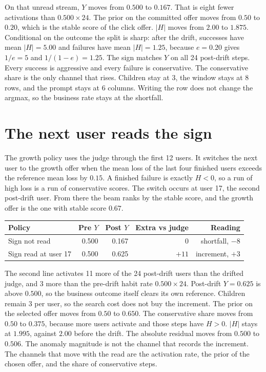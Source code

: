\documentclass[11pt,a4paper]{article}
\begin{document}
On that unread stream, \(Y\) moves from \(0.500\) to \(0.167\).
That is eight fewer activations than \(0.500\times 24\).
The prior on the committed offer moves from \(0.50\) to \(0.20\), which is the stable score of the click offer.
\(|H|\) moves from \(2.00\) to \(1.875\).
Conditional on the outcome the split is sharp: after the drift, successes have mean \(|H|=5.00\) and failures have mean \(|H|=1.25\), because \(e=0.20\) gives \(1/e=5\) and \(1/(1-e)=1.25\).
The sign matches \(Y\) on all 24 post-drift steps.
Every success is aggressive and every failure is conservative.
The conservative share is the only channel that rises.
Children stay at 3, the window stays at 8 rows, and the prompt stays at 6 columns.
Writing the row does not change the argmax, so the business rate stays at the shortfall.

\section{The next user reads the sign}
The growth policy uses the judge through the first 12 users.
It switches the next user to the growth offer when the mean loss of the last four finished users exceeds the reference mean loss by \(0.15\).
A finished failure is exactly \(H<0\), so a run of high loss is a run of conservative scores.
The switch occurs at user 17, the second post-drift user.
From there the beam ranks by the stable score, and the growth offer is the one with stable score \(0.67\).

\begin{center}
\begin{tabular}{lrrrr}
\toprule
Policy & Pre \(Y\) & Post \(Y\) & Extra vs judge & Reading \\
\midrule
Sign not read & 0.500 & 0.167 & 0 & shortfall, \(-8\) \\
Sign read at user 17 & 0.500 & 0.625 & \(+11\) & increment, \(+3\) \\
\bottomrule
\end{tabular}
\end{center}

The second line activates 11 more of the 24 post-drift users than the drifted judge, and 3 more than the pre-drift habit rate \(0.500\times 24\).
Post-drift \(Y=0.625\) is above \(0.500\), so the business outcome itself clears its own reference.
Children remain 3 per user, so the search cost does not buy the increment.
The prior on the selected offer moves from \(0.50\) to \(0.650\).
The conservative share moves from \(0.50\) to \(0.375\), because more users activate and those steps have \(H>0\).
\(|H|\) stays at \(1.995\), against \(2.00\) before the drift.
The absolute residual moves from \(0.500\) to \(0.506\).
The anomaly magnitude is not the channel that records the increment.
The channels that move with the read are the activation rate, the prior of the chosen offer, and the share of conservative steps.
\end{document}
